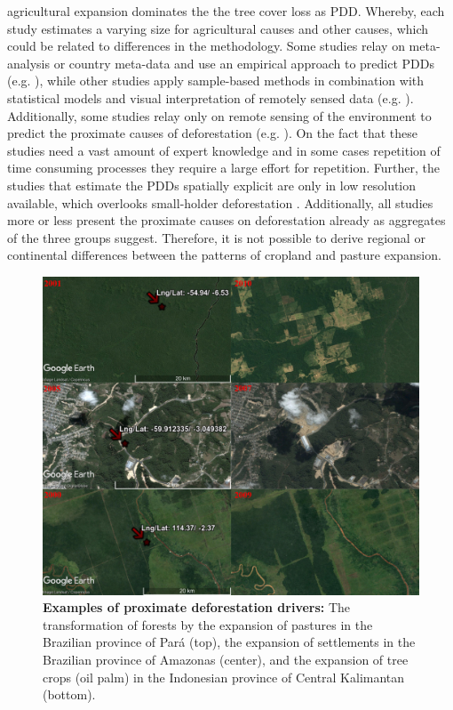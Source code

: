 agricultural expansion dominates the the tree cover loss as \ac{PDD}. Whereby, each study estimates a varying size for agricultural causes and other causes, which could be related to differences in the methodology. Some studies relay on meta-analysis or country meta-data and use an empirical approach to predict \acp{PDD} (e.g. \citet{Hosonuma2012,Geist2002,DeFries2010,Carter2018,Ruf2014}), while other studies apply sample-based methods in combination with statistical models and visual interpretation of remotely sensed data (e.g. \citet{Sy2015,Austin2019,Curtis2018,Meyfroidt2013,Caldas2013}). Additionally, some studies relay only on remote sensing of the environment to predict the proximate causes of deforestation (e.g. \citet{Caldas2013,Zalles2018,Graesser2015,Connette2016,Barima2016}). On the fact that these studies need a vast amount of expert knowledge and in some cases repetition of time consuming processes they require a large effort for repetition. Further, the studies that estimate the \acp{PDD} spatially explicit are only in low resolution available, which overlooks small-holder deforestation \citep{Curtis2018,Caldas2013}. Additionally, all studies more or less present the proximate causes on deforestation already as aggregates of the three groups \citeauthor{Geist2001} suggest. Therefore, it is not possible to derive regional or continental differences between the patterns of cropland and pasture expansion.
	\begin{figure}[ht]
		\centering
		\includegraphics[scale=0.6]{img/deforestation_examples}
		\caption[Examples of proximate deforestation drivers]{\textbf{Examples of proximate deforestation drivers:} The transformation of forests by the expansion of pastures in the Brazilian province of Pará (top), the expansion of settlements in the Brazilian province of Amazonas (center), and the expansion of tree crops (oil palm) in the Indonesian province of Central Kalimantan (bottom).}
		\label{fig:deforestationexamples}
	\end{figure}

